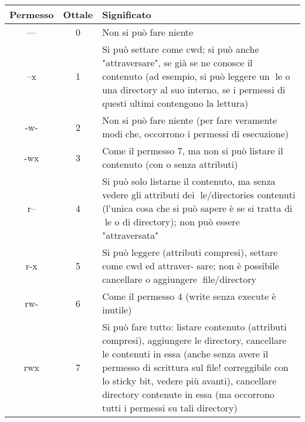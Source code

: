 \begin{center}
	\begin{tabular}{|c|c|p{10cm}|} 
		\hline
		Permesso & Ottale & Significato \\ \hline
		--- & 0 & Non si può fare niente \\ \hline
		--x & 1 & Si  può settare  come  cwd;  si  può anche  "attraversare",  se  già se
		ne conosce il contenuto (ad esempio, si può leggere un le o una
		directory al suo interno, se i permessi di questi ultimi contengono
		la lettura) \\ \hline
		-w- & 2 & Non si può fare niente (per fare veramente modiche, occorrono i
		permessi di esecuzione) \\ \hline
		-wx & 3 & Come  il  permesso  7,  ma  non  si  può listare  il  contenuto  (con  o
		senza attributi) \\ \hline
		r-- & 4 & Si  può solo  listarne  il  contenuto,  ma  senza  vedere  gli  attributi
		dei le/directories contenuti (l'unica cosa che si può sapere è se si
		tratta di le o di directory); non può essere "attraversata"\\ \hline		
		r-x & 5 & Si può leggere (attributi compresi), settare come cwd ed attraver-
		sare; non è possibile cancellare o aggiungere file/directory \\ \hline
		rw- & 6 & Come il permesso 4 (write senza execute è inutile) \\ \hline
		rwx & 7 & Si può fare tutto: listare contenuto (attributi compresi), aggiungere le directory, cancellare le contenuti in essa (anche senza avere il permesso di scrittura sul file! correggibile con lo sticky bit, vedere più avanti), cancellare directory contenute in essa (ma occorrono tutti i permessi su tali directory) \\ \hline
	\end{tabular}
\end{center}